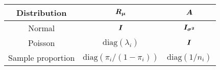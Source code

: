 \begin{frame}
  \vspace{1.9cm}
  \begin{table}
    \begin{tabular}{c|cc}
      \hline
      Distribution & $ \boldsymbol{R_\mu} $ & $ \boldsymbol{A} $ \\
      \hline
      Normal            & $ \boldsymbol{I} $                      & $ \boldsymbol{I_{\sigma^2}} $ \\
      Poisson           & $ \text{diag}(\lambda_i) $        & $ \boldsymbol{I} $            \\
      Sample proportion & $ \text{diag}(\pi_i/(1-\pi_i)) $  & $ \text{diag}(1/n_i) $        \\
      \hline
    \end{tabular}
  \end{table}
\end{frame}




